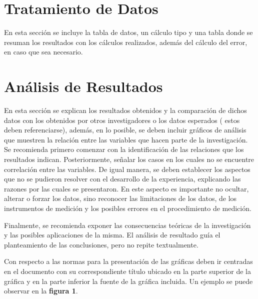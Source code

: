 \documentclass[11pt]{article}
\begin{document}
	\vspace*{-0.72cm} %
	\section*{Tratamiento de Datos}
	\vspace*{-0.35cm} %
	En esta sección se incluye la tabla de datos, un cálculo tipo y una tabla donde se resuman los resultados con los cálculos realizados, además del cálculo del error, en caso que sea necesario.
	
	\vspace*{-0.72cm} %
	\section*{Análisis de Resultados}
	\vspace*{-0.35cm} %
	En esta sección se explican los resultados obtenidos y la comparación de dichos datos con los obtenidos por otros investigadores o los datos esperados  ( estos deben referenciarse), además, en lo posible, se deben incluir gráficos de análisis que muestren la relación entre las variables que hacen parte de la investigación.  Se recomienda primero comenzar con la identificación de las relaciones que los resultados indican.  Posteriormente, señalar los casos en los cuales no se encuentre correlación entre las variables.  De igual manera, se deben establecer los aspectos que no se pudieron resolver con el desarrollo de la experiencia, explicando las razones por las cuales se presentaron.  En este aspecto es importante no ocultar, alterar o forzar los datos, sino reconocer las limitaciones de los datos, de los instrumentos de medición y los posibles errores en el procedimiento de medición.
	
	Finalmente, se recomienda exponer las consecuencias teóricas de la investigación y las posibles aplicaciones de la misma.  El análisis de resultado guía el planteamiento de las conclusiones, pero no repite textualmente.
	
	Con respecto a las normas para la presentación de las gráficas deben ir centradas en el documento con su correspondiente título ubicado en la parte superior de la gráfica y en la parte inferior la fuente de la gráfica incluida. Un ejemplo se puede observar en la \textbf{figura 1}.
	
\end{document}
